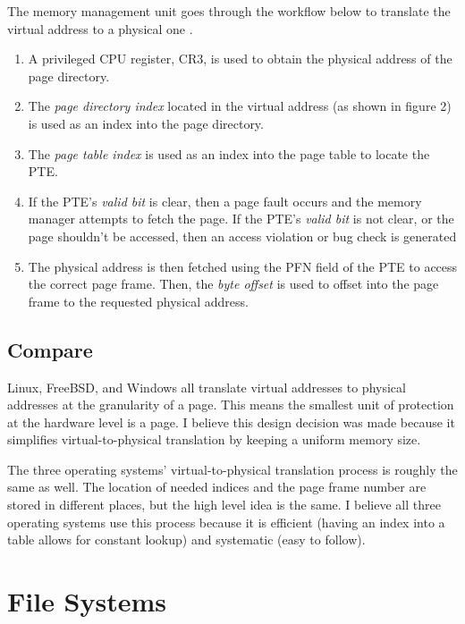 \documentclass[onecolumn,draftclsnofoot, 10pt, compsoc]{IEEEtran}
\begin{document}
			The memory management unit goes through the workflow below to translate the virtual address to a physical one \cite{windowsMM}.
			\begin{enumerate}
				\item{
					A privileged CPU register, CR3, is used to obtain the physical address of the page directory.
				}
				\item{
					The \textit{page directory index} located in the virtual address (as shown in figure 2) is used as an index into the page directory.}
				\item{
					The \textit{page table index} is used as an index into the page table to locate the PTE.}
				\item{
					If the PTE's \textit{valid bit} is clear, then a page fault occurs and the memory manager attempts to fetch the page.
					If the PTE's \textit{valid bit} is not clear, or the page shouldn't be accessed, then an access violation or bug check is generated}
				\item{
					The physical address is then fetched using the PFN field of the PTE to access the correct page frame.
					Then, the \textit{byte offset} is used to offset into the page frame to the requested physical address.}
			\end{enumerate}
		
		\subsection{Compare}
			Linux, FreeBSD, and Windows all translate virtual addresses to physical addresses at the granularity of a page.
			This means the smallest unit of protection at the hardware level is a page. 
			I believe this design decision was made because it simplifies virtual-to-physical translation by keeping a uniform memory size.
			
			The three operating systems' virtual-to-physical translation process is roughly the same as well.
			The location of needed indices and the page frame number are stored in different places, but the high level idea is the same.
			I believe all three operating systems use this process because it is efficient (having an index into a table allows for constant lookup) and systematic (easy to follow).



	
\section{File Systems}
\end{document}
